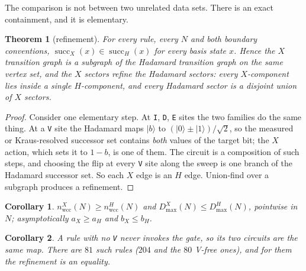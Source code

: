 \documentclass[11pt]{article}
\newcommand{\rt}[1]{\texttt{#1}}
\providecommand{\ket}[1]{|#1\rangle}
\newcommand{\wcc}{\mathrm{wcc}}
\theoremstyle{plain}
\newtheorem{theorem}{Theorem}
\newtheorem{corollary}{Corollary}
\theoremstyle{remark}
\begin{document}
The comparison is not between two unrelated data sets. There is an exact
containment, and it is elementary.

\begin{theorem}[refinement]
\label{thm:refine}
For every rule, every $N$ and both boundary conventions,
$\operatorname{succ}_X(x)\in\operatorname{succ}_H(x)$ for every basis state $x$.
Hence the $X$ transition graph is a subgraph of the Hadamard transition graph on
the same vertex set, and the $X$ sectors refine the Hadamard sectors: every
$X$-component lies inside a single $H$-component, and every Hadamard sector is a
disjoint union of $X$ sectors.
\end{theorem}

\begin{proof}
Consider one elementary step. At \rt{I}, \rt{D}, \rt{E} sites the two families do
the same thing. At a \rt{V} site the Hadamard maps $\ket{b}$ to
$(\ket0\pm\ket1)/\sqrt2$, so the measured or Kraus-resolved successor set contains
\emph{both} values of the target bit; the $X$ action, which sets it to $1-b$, is
one of them. The circuit is a composition of such steps, and choosing the flip at
every \rt{V} site along the sweep is one branch of the Hadamard successor set. So
each $X$ edge is an $H$ edge. Union-find over a subgraph produces a refinement.
\end{proof}

\begin{corollary}
\label{cor:mono}
$n_\wcc^X(N)\ge n_\wcc^H(N)$ and $D_{\max}^X(N)\le D_{\max}^H(N)$, pointwise in
$N$; asymptotically $a_X\ge a_H$ and $b_X\le b_H$.
\end{corollary}

\begin{corollary}
\label{cor:nofree}
A rule with no \rt{V} never invokes the gate, so its two circuits are the
\emph{same map}. There are $81$ such rules ($204$ and the $80$ V-free ones), and
for them the refinement is an equality.
\end{corollary}
\end{document}
